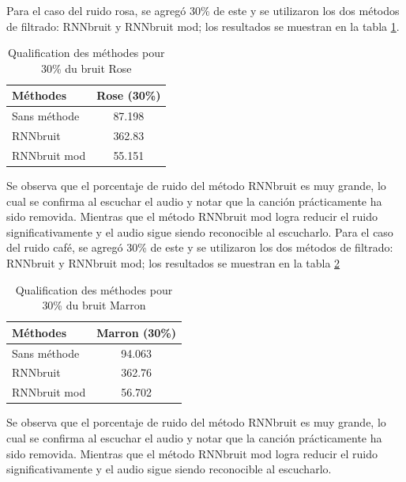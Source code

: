 \documentclass[conference,onecolumn]{IEEEtran}
\begin{document}
Para el caso del ruido rosa, se agregó 30\% de este y se utilizaron los dos métodos de filtrado: RNNbruit y RNNbruit mod; los resultados se muestran en la tabla \ref{table:t8}.
\clearpage

\begin{table}[hbt!]
    \centering
    \begin{tabular}{ l  c }
    \textbf{Méthodes} & \textbf{Rose (30\%)} \\
    \hline
    Sans méthode &  87.198\\
    RNNbruit &  362.83\\
    RNNbruit mod &  55.151\\
    \end{tabular}
    \caption{Qualification des méthodes pour 30\% du bruit Rose}
    \label{table:t8}
\end{table}

Se observa que el porcentaje de ruido del método RNNbruit es muy grande, lo cual se confirma al escuchar el audio y notar que la canción prácticamente ha sido removida. Mientras que el método RNNbruit mod logra reducir el ruido significativamente y el audio sigue siendo reconocible al escucharlo.
Para el caso del ruido café, se agregó 30\% de este y se utilizaron los dos métodos de filtrado: RNNbruit y RNNbruit mod; los resultados se muestran en la tabla \ref{table:t9} 

\begin{table}[hbt!]
    \centering
    \begin{tabular}{ l  c }
    \textbf{Méthodes} & \textbf{Marron (30\%)} \\
    \hline
    Sans méthode &  94.063\\
    RNNbruit &  362.76\\
    RNNbruit mod &  56.702\\
    \end{tabular}
    \caption{Qualification des méthodes pour 30\% du bruit Marron}
    \label{table:t9}
\end{table}

Se observa que el porcentaje de ruido del método RNNbruit es muy grande, lo cual se confirma al escuchar el audio y notar que la canción prácticamente ha sido removida. Mientras que el método RNNbruit mod logra reducir el ruido significativamente y el audio sigue siendo reconocible al escucharlo.
\end{document}
